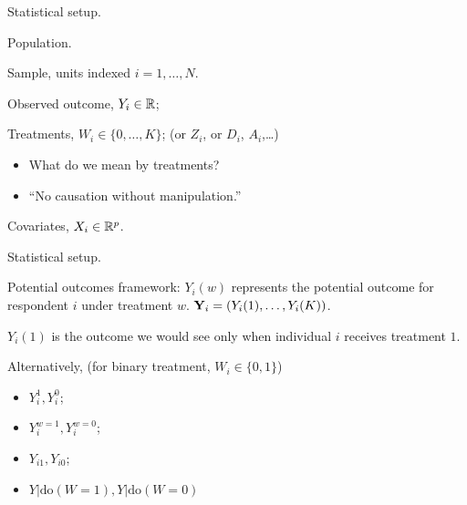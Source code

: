 \documentclass[xcolor={dvipsnames}, handout]{beamer}
\begin{document}
\begin{frame}{Statistical setup.}

\begin{wideitemize}
\item Population. \pause
\item Sample, units indexed $i = 1, \dots, N$.\pause
\item Observed outcome, $Y_i\in {\mathbb R}$;\pause
\item Treatments, $W_i \in \{0, \dots, K\}$; \pause (or $Z_i$, or $D_i$, $A_i$,\dots)\pause
\begin{itemize}
\item What do we mean by treatments? \pause
\item ``No causation without manipulation.'' \citep{holland1986}\pause
\end{itemize}
\item Covariates, $X_i \in {\mathbb R}^p$.
\end{wideitemize}

\end{frame}



\begin{frame}{Statistical setup.}

\begin{wideitemize}
\item Potential outcomes framework: $Y_i(w)$ represents the potential outcome for respondent $i$ under treatment $w$. \pause $\mathbf{Y}_i = (Y_i(1), \dots, Y_i(K))$.\pause
\item $Y_i(1)$ is the outcome we would see only when individual $i$ receives treatment $1$. \pause
\item Alternatively, (for binary treatment, $W_i \in\{0,1\}$) 
\begin{itemize}
\item $Y_i^1, Y_i^0$; 
\item $Y_i^{w=1},Y_i^{w=0}$; 
\item $Y_{i1}, Y_{i0}$; 
\item $Y|\textrm{do}(W = 1), Y|\textrm{do}(W = 0)$
\end{itemize}
\end{wideitemize}

\end{frame}
\end{document}
